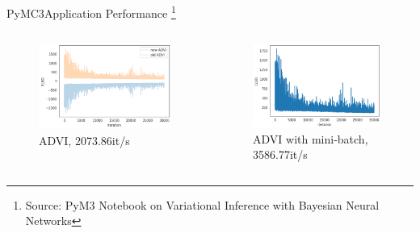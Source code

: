 \documentclass[AERbeamer%
              ,optEnglish%
              ,optBiber%
              ,optBibstyleAlphabetic%
              ,optBeamerClassicFormat%
              ]{AERlatex}%
\begin{document}
\begin{frame}[c]{PyMC3}{Application Performance \footnote{Source: PyM3 Notebook on Variational Inference with Bayesian Neural Networks}}
    \centering
    \begin{columns}[T]
        \begin{column}{0.48\textwidth}
            \centering
            \begin{figure}
                \centering
                \includegraphics[width=\textwidth]{PyMC3ELBOAdvi.png}
                \caption{ADVI, 2073.86it/s}
            \end{figure}
        \end{column}
        \begin{column}{0.48\textwidth}
            \centering
            \begin{figure}
                \centering
                \includegraphics[width=\textwidth]{PyMC3ELBOMiniBatchAdvi.png}
                \caption{ADVI with mini-batch, 3586.77it/s}
            \end{figure}
        \end{column}
    \end{columns}
\end{frame}
\end{document}

